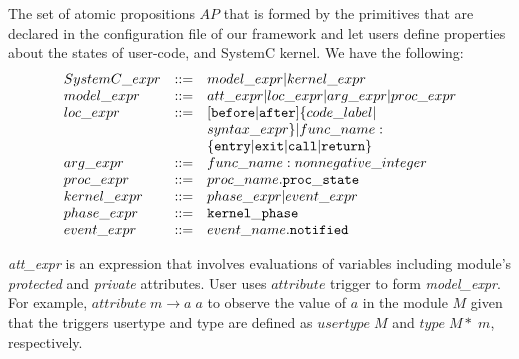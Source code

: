 \documentclass{llncs}
\begin{document}
The set of atomic propositions $AP$ that is formed by the primitives that are declared in the configuration file of our framework and let users define properties about the states of user-code, and SystemC kernel. We have the following:
\begin{displaymath}
\begin{array}{l l l}
SystemC\_expr &::=& model\_expr | kernel\_expr\\
model\_expr &::=& att\_expr | loc\_expr | arg\_expr | proc\_expr\\
loc\_expr &::=& [\begin{tt}before\end{tt} | \begin{tt}after\end{tt}]\{code\_label |\\
          &&syntax\_expr\} | func\_name:\\
          && \{\begin{tt}entry\end{tt} | \begin{tt}exit\end{tt} | \begin{tt}call\end{tt} | \begin{tt}return\end{tt}\}\\
arg\_expr &::=& func\_name: nonnegative\_integer\\
proc\_expr &::=& proc\_name.\begin{tt}proc\_state\end{tt}\\
kernel\_expr &::=& phase\_expr | event\_expr\\
phase\_expr &::=& \begin{tt}kernel\_phase\end{tt}\\
event\_expr &::=& event\_name.\begin{tt}notified\end{tt}
\end{array}
\end{displaymath}

\textit{att\_expr} is an expression that involves evaluations of variables including module's \textit{protected} and \textit{private} attributes. User uses $attribute$ trigger to form \textit{model\_expr}. For example, $attribute \; m \rightarrow a \; a$ to observe the value of $a$ in the module $M$ given that the triggers usertype and type are defined as $usertype \; M$ and $type \; M* \; m$, respectively.
\end{document}
